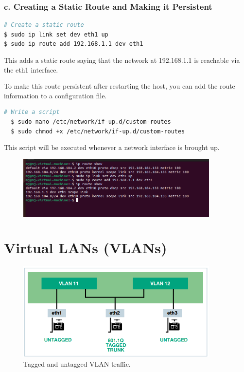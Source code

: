 \documentclass{report}
\begin{document}
\subsubsection*{c. Creating a Static Route and Making it Persistent}

\begin{lstlisting}[language=bash]
# Create a static route
$ sudo ip link set dev eth1 up
$ sudo ip route add 192.168.1.1 dev eth1
\end{lstlisting} 

This adds a static route saying that the network at 192.168.1.1 is reachable via the eth1 interface.

To make this route persistent after restarting the host, you can add the route information to a configuration file.
\begin{lstlisting}[language=bash]
  # Write a script
  $ sudo nano /etc/network/if-up.d/custom-routes
  $ sudo chmod +x /etc/network/if-up.d/custom-routes
\end{lstlisting}

This script will be executed whenever a network interface is brought up.

\begin{figure}[h] 
  \centering 
  \includegraphics[width=0.9\textwidth]{18.png} 
\end{figure} 



\section*{Virtual LANs (VLANs)}

\begin{figure}[h] 
  \centering 
  \includegraphics[width=0.9\textwidth]{23.png} 
  \captionsetup{labelformat=empty}
  \caption{Tagged and untagged VLAN traffic.\cite{5}}
\end{figure} 
  
\end{document}
